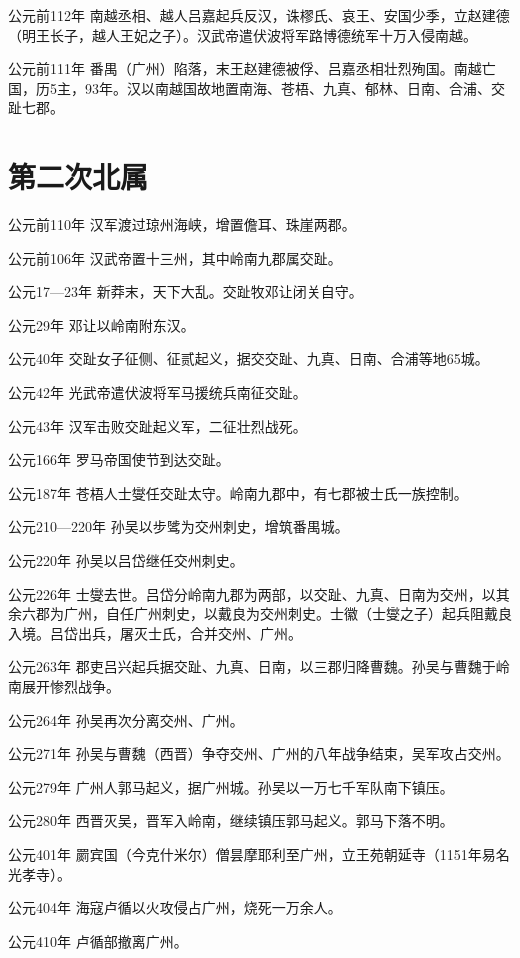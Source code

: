 公元前112年 南越丞相、越人吕嘉起兵反汉，诛樛氏、哀王、安国少季，立赵建德（明王长子，越人王妃之子）。汉武帝遣伏波将军路博德统军十万入侵南越。

公元前111年 番禺（广州）陷落，末王赵建德被俘、吕嘉丞相壮烈殉国。南越亡国，历5主，93年。汉以南越国故地置南海、苍梧、九真、郁林、日南、合浦、交趾七郡。

\section*{第二次北属}

公元前110年 汉军渡过琼州海峡，增置儋耳、珠崖两郡。

公元前106年 汉武帝置十三州，其中岭南九郡属交趾。

公元17—23年 新莽末，天下大乱。交趾牧邓让闭关自守。

公元29年 邓让以岭南附东汉。

公元40年 交趾女子征侧、征贰起义，据交交趾、九真、日南、合浦等地65城。

公元42年 光武帝遣伏波将军马援统兵南征交趾。

公元43年 汉军击败交趾起义军，二征壮烈战死。

公元166年 罗马帝国使节到达交趾。

公元187年 苍梧人士燮任交趾太守。岭南九郡中，有七郡被士氏一族控制。

公元210—220年 孙吴以步骘为交州刺史，增筑番禺城。

公元220年 孙吴以吕岱继任交州刺史。

公元226年 士燮去世。吕岱分岭南九郡为两部，以交趾、九真、日南为交州，以其余六郡为广州，自任广州刺史，以戴良为交州刺史。士徽（士燮之子）起兵阻戴良入境。吕岱出兵，屠灭士氏，合并交州、广州。

公元263年 郡吏吕兴起兵据交趾、九真、日南，以三郡归降曹魏。孙吴与曹魏于岭南展开惨烈战争。

公元264年 孙吴再次分离交州、广州。

公元271年 孙吴与曹魏（西晋）争夺交州、广州的八年战争结束，吴军攻占交州。

公元279年 广州人郭马起义，据广州城。孙吴以一万七千军队南下镇压。

公元280年 西晋灭吴，晋军入岭南，继续镇压郭马起义。郭马下落不明。

公元401年 罽宾国（今克什米尔）僧昙摩耶利至广州，立王苑朝延寺（1151年易名光孝寺）。

公元404年 海寇卢循以火攻侵占广州，烧死一万余人。

公元410年 卢循部撤离广州。

